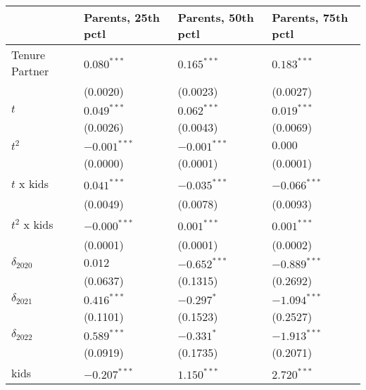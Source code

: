 \begin{tabular}{llll}
\toprule
{} & Parents, 25th pctl & Parents, 50th pctl & Parents, 75th pctl \\
\midrule
Tenure Partner                          &      $0.080^{***}$ &      $0.165^{***}$ &      $0.183^{***}$ \\
                                        &           (0.0020) &           (0.0023) &           (0.0027) \\
$t$                                     &      $0.049^{***}$ &      $0.062^{***}$ &      $0.019^{***}$ \\
                                        &           (0.0026) &           (0.0043) &           (0.0069) \\
$t^2$                                   &     $-0.001^{***}$ &     $-0.001^{***}$ &            $0.000$ \\
                                        &           (0.0000) &           (0.0001) &           (0.0001) \\
$t$ x kids                              &      $0.041^{***}$ &     $-0.035^{***}$ &     $-0.066^{***}$ \\
                                        &           (0.0049) &           (0.0078) &           (0.0093) \\
$t^2$ x kids                            &     $-0.000^{***}$ &      $0.001^{***}$ &      $0.001^{***}$ \\
                                        &           (0.0001) &           (0.0001) &           (0.0002) \\
$\delta_{2020}$                         &            $0.012$ &     $-0.652^{***}$ &     $-0.889^{***}$ \\
                                        &           (0.0637) &           (0.1315) &           (0.2692) \\
$\delta_{2021}$                         &      $0.416^{***}$ &         $-0.297^*$ &     $-1.094^{***}$ \\
                                        &           (0.1101) &           (0.1523) &           (0.2527) \\
$\delta_{2022}$                         &      $0.589^{***}$ &         $-0.331^*$ &     $-1.913^{***}$ \\
                                        &           (0.0919) &           (0.1735) &           (0.2071) \\
kids                                    &     $-0.207^{***}$ &      $1.150^{***}$ &      $2.720^{***}$ \\

\end{tabular}
